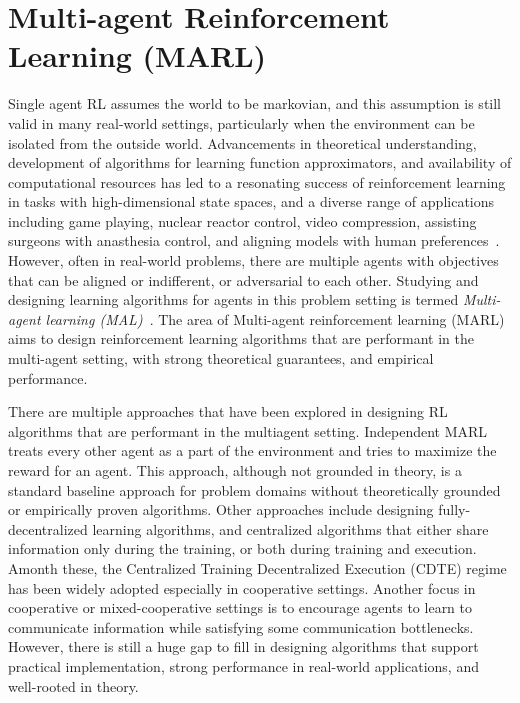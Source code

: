 \section{Multi-agent Reinforcement Learning (MARL)}\label{sec:marl}
Single agent RL assumes the world to be markovian, and this assumption is still valid in many
real-world settings, particularly when the environment can be isolated from the outside world.
Advancements in theoretical understanding, development of algorithms for learning function
approximators, and availability of computational resources has led to a resonating success of
reinforcement learning in tasks with high-dimensional state spaces, and a diverse range of
applications including game playing, nuclear reactor control, video compression, assisting surgeons
with anasthesia control, and aligning models with human preferences~.
However, often in real-world problems, there are multiple agents with objectives that can be
aligned or indifferent, or adversarial to each other.
Studying and designing learning algorithms for agents in this problem setting is termed
\textit{Multi-agent learning (MAL)}~\cite{tuylsMultiagent2012}.
The area of Multi-agent reinforcement learning (MARL) aims to design reinforcement learning
algorithms that are performant in the multi-agent setting, with strong theoretical guarantees, and
empirical performance.

There are multiple approaches that have been explored in designing RL algorithms that are
performant in the multiagent setting.
Independent MARL treats every other agent as a part of the environment and tries to maximize the
reward for an agent.
This approach, although not grounded in theory, is a standard baseline approach for problem domains
without theoretically grounded or empirically proven algorithms.
Other approaches include designing fully-decentralized learning algorithms, and centralized
algorithms that either share information only during the training, or both during training and
execution.
Amonth these, the Centralized Training Decentralized Execution (CDTE) regime has been widely
adopted especially in cooperative settings.
Another focus in cooperative or mixed-cooperative settings is to encourage agents to learn to
communicate information while satisfying some communication bottlenecks.
However, there is still a huge gap to fill in designing algorithms that support practical
implementation, strong performance in real-world applications, and well-rooted in theory.

